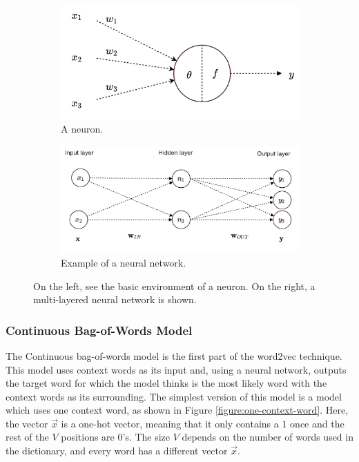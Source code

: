 \documentclass[a4paper,11pt]{article}
\begin{document}
\begin{figure}[h]
\begin{subfigure}{.5\textwidth}
  \centering
  \includegraphics[width=.8\linewidth]{Neuron.png}
  \caption{A neuron.}
  \label{figure:neuron}
\end{subfigure}%
\begin{subfigure}{.6\textwidth}
  \centering
  \includegraphics[width=.9\linewidth]{NeuralNetworkExample.png}
  \caption{Example of a neural network.}
  \label{figure:neuralnetwork}
\end{subfigure}
\caption{On the left, see the basic environment of a neuron. On the right, a multi-layered neural network is shown.}
\label{figure:NeuralNetworks}
\end{figure}

\subsubsection{Continuous Bag-of-Words Model}
The Continuous bag-of-words model \cite{Mikolov2013a} is the first part of the word2vec technique. This model uses context words as its input and, using a neural network, outputs the target word for which the model thinks is the most likely word with the context words as its surrounding. The simplest version of this model is a model which uses one context word, as shown in Figure \ref{figure:one-context-word}. Here, the vector $\vec{x}$ is a one-hot vector, meaning that it only contains a $1$ once and the rest of the $V$ positions are $0$'s. The size $V$ depends on the number of words used in the dictionary, and every word has a different vector $\vec{x}$.
\end{document}
